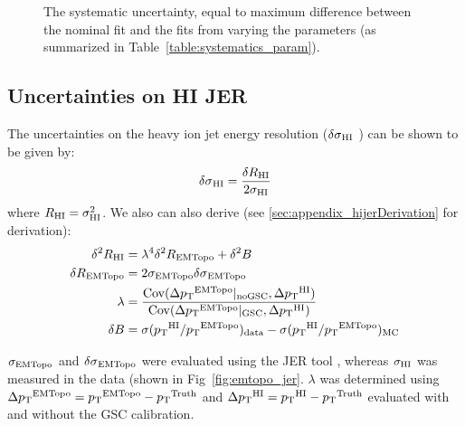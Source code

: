 \begin{figure}
	\centering
	\caption{The systematic uncertainty, equal to maximum difference between the nominal fit and the fits from varying the parameters (as summarized in Table~\ref{table:systematics_param}).  }
	\label{fig:sys_uncert}%
\end{figure}


\subsection{Uncertainties on HI JER}
\label{sec:qual_jeruncertainties}
The uncertainties on the heavy ion jet energy resolution ($\mbox{$\delta \sigma$}_{\mathrm{HI}}$ ) can be shown to be given by: 
\begin{align}
\mbox{$\delta \sigma$}_{\mathrm{HI}} = \frac{\delta R_{\mathrm{HI}}}{2 \sigma_{\mathrm{HI}}}
\end{align} 
where $R_{\mathrm{HI}} = \sigma_{\mathrm{HI}}^2$. We also can also derive (see \ref{sec:appendix_hijerDerivation} for derivation):
\begin{align}
\delta^2 R_{\mathrm{HI}} &= \lambda^4 \delta^2 R_{\text{EMTopo}} + \delta^2 B \\
\delta R_{\text{EMTopo}}  &= 2 \sigma_{\text{EMTopo}} \mbox{$\delta \sigma$}_{\text{EMTopo}} \\
\lambda &= \frac{\mathrm{Cov}(\Delta \mbox{$p_{\mathrm{T}}$}^{\text{EMTopo}} | _\mathrm{noGSC}, \Delta \mbox{$p_{\mathrm{T}}$}^{\mathrm{HI}})}{\mathrm{Cov}(\Delta \mbox{$p_{\mathrm{T}}$}^{\text{EMTopo}} | _\mathrm{GSC}, \Delta \mbox{$p_{\mathrm{T}}$}^{\mathrm{HI}})} \label{eq:lambda} \\ 
\delta B &= \sigma(\mbox{$p_{\mathrm{T}}$}^{\mathrm{HI}}/\mbox{$p_{\mathrm{T}}$}^{\text{EMTopo}})_\mathrm{data} - \sigma(\mbox{$p_{\mathrm{T}}$}^{\mathrm{HI}}/\mbox{$p_{\mathrm{T}}$}^{\text{EMTopo}})_\mathrm{MC} 
\end{align} 

$\sigma_{\text{EMTopo}}$ and $\mbox{$\delta \sigma$}_{\text{EMTopo}}$ were evaluated using the JER tool \cite{JERTool}, whereas $\sigma_{\mathrm{HI}}$ was measured in the data (shown in Fig~\ref{fig:emtopo_jer}. $\lambda$ was determined using $\Delta\mbox{$p_{\mathrm{T}}$}^{\text{EMTopo}} = \mbox{$p_{\mathrm{T}}$}^{\text{EMTopo}} - \mbox{$p_{\mathrm{T}}$}^{\mathrm{Truth}}$ and $\Delta\mbox{$p_{\mathrm{T}}$}^{\mathrm{HI}} =\mbox{$p_{\mathrm{T}}$}^{\mathrm{HI}} - \mbox{$p_{\mathrm{T}}$}^{\mathrm{Truth}}$ evaluated with and without the GSC calibration. 

